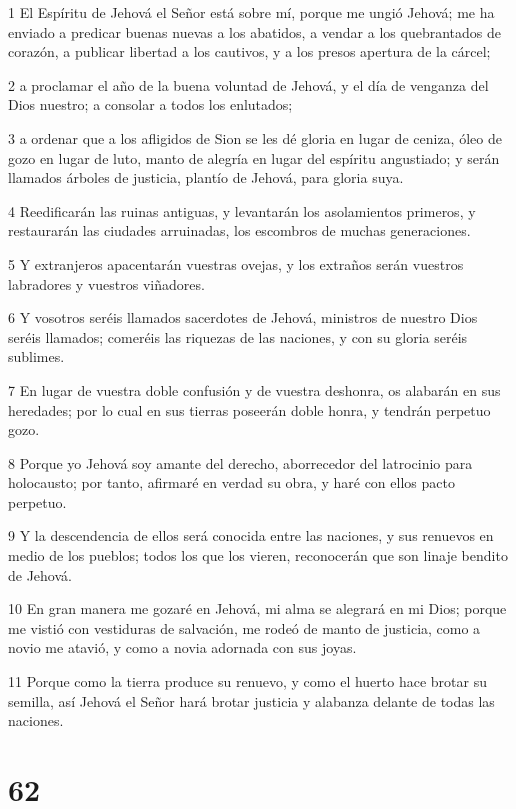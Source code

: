\par 1 El Espíritu de Jehová el Señor está sobre mí, porque me ungió Jehová; me ha enviado a predicar buenas nuevas a los abatidos, a vendar a los quebrantados de corazón, a publicar libertad a los cautivos, y a los presos apertura de la cárcel;
\par 2 a proclamar el año de la buena voluntad de Jehová, y el día de venganza del Dios nuestro; a consolar a todos los enlutados; 
\par 3 a ordenar que a los afligidos de Sion se les dé gloria en lugar de ceniza, óleo de gozo en lugar de luto, manto de alegría en lugar del espíritu angustiado; y serán llamados árboles de justicia, plantío de Jehová, para gloria suya.
\par 4 Reedificarán las ruinas antiguas, y levantarán los asolamientos primeros, y restaurarán las ciudades arruinadas, los escombros de muchas generaciones.
\par 5 Y extranjeros apacentarán vuestras ovejas, y los extraños serán vuestros labradores y vuestros viñadores.
\par 6 Y vosotros seréis llamados sacerdotes de Jehová, ministros de nuestro Dios seréis llamados; comeréis las riquezas de las naciones, y con su gloria seréis sublimes.
\par 7 En lugar de vuestra doble confusión y de vuestra deshonra, os alabarán en sus heredades; por lo cual en sus tierras poseerán doble honra, y tendrán perpetuo gozo.
\par 8 Porque yo Jehová soy amante del derecho, aborrecedor del latrocinio para holocausto; por tanto, afirmaré en verdad su obra, y haré con ellos pacto perpetuo.
\par 9 Y la descendencia de ellos será conocida entre las naciones, y sus renuevos en medio de los pueblos; todos los que los vieren, reconocerán que son linaje bendito de Jehová. 
\par 10 En gran manera me gozaré en Jehová, mi alma se alegrará en mi Dios; porque me vistió con vestiduras de salvación, me rodeó de manto de justicia, como a novio me atavió, y como a novia adornada con sus joyas. 
\par 11 Porque como la tierra produce su renuevo, y como el huerto hace brotar su semilla, así Jehová el Señor hará brotar justicia y alabanza delante de todas las naciones.

\chapter{62}

